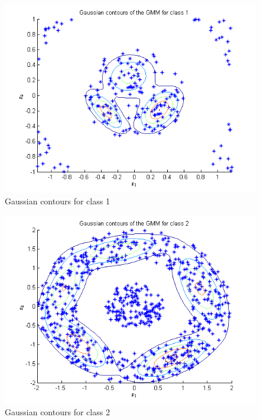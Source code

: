 \documentclass{article}
\begin{document}
\begin{figure}[H]
\centering
\includegraphics[width=\linewidth]{Classification/nonlinearlySeparable/gmm_1.png}
\caption{Gaussian contours for class 1}
\end{figure}



\begin{figure}[H]
\centering
\includegraphics[width=\linewidth]{Classification/nonlinearlySeparable/gmm_2.png}
\caption{Gaussian contours for class 2}
\end{figure}
\end{document}
